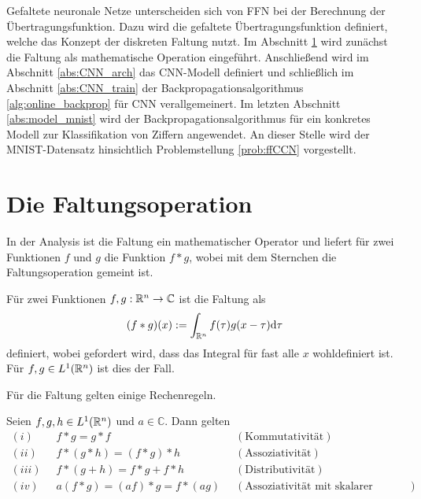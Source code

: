 Gefaltete neuronale Netze unterscheiden sich von FFN bei der Berechnung der Übertragungsfunktion. Dazu wird die gefaltete Übertragungsfunktion definiert, welche das Konzept der diskreten Faltung nutzt. Im Abschnitt \ref{abs:conv_theorie} wird zunächst die Faltung als mathematische Operation eingeführt. 
Anschließend wird im Abschnitt \ref{abs:CNN_arch} das CNN-Modell definiert und schließlich im Abschnitt \ref{abs:CNN_train} der Backpropagationsalgorithmus \ref{alg:online_backprop} für CNN verallgemeinert. Im letzten Abschnitt \ref{abs:model_mnist} wird der Backpropagationsalgorithmus für ein konkretes Modell zur Klassifikation von Ziffern angewendet. An dieser Stelle wird der MNIST-Datensatz hinsichtlich Problemstellung \ref{prob:ffCCN} vorgestellt.

\section{Die Faltungsoperation}
\label{abs:conv_theorie}
In der Analysis ist die Faltung ein mathematischer Operator und liefert für zwei Funktionen $f$ und $g$ die Funktion $ f \ast g$, wobei mit dem Sternchen die Faltungsoperation gemeint ist.

\begin{defi}[Faltung]\label{allg_faltung}
    Für zwei Funktionen $f,g: \mathbb{R}^{n} \rightarrow \mathbb{C}$ ist die Faltung als
    \begin{equation*}
        (f \ast g) (x) := \int_{\mathbb{R}^{n}} f(\tau) g(x-\tau) \mathrm{d} \tau
    \end{equation*}
    definiert, wobei gefordert wird, dass das Integral für fast alle $x$ wohldefiniert ist. Für $f,g \in L^1(\mathbb{R}^n)$ ist dies der Fall.
   \end{defi}

Für die Faltung gelten einige Rechenregeln.

\begin{lem}
    \label{lem:convrules}
    Seien $f,g,h \in L^1(\mathbb{R}^n)$ und $a \in \mathbb{C}$. Dann gelten
    \begin{align*}
         (i) \; \; &f \ast g = g \ast f \; \; &( \text{Kommutativität}) \\
         (ii) \; \; &f \ast (g \ast h) = (f \ast g) \ast h  \; \;& (\text{Assoziativität}) \\
         (iii) \; \; &f \ast (g+h) = f \ast g + f\ast h \; \; &(\text{Distributivität}) \\ 
         (iv) \; \; &a(f \ast g) = (af) \ast g = f \ast (ag) \; \; &(\text{Assoziativität mit skalarer Multiplikation}) 
    \end{align*}
\end{lem}

